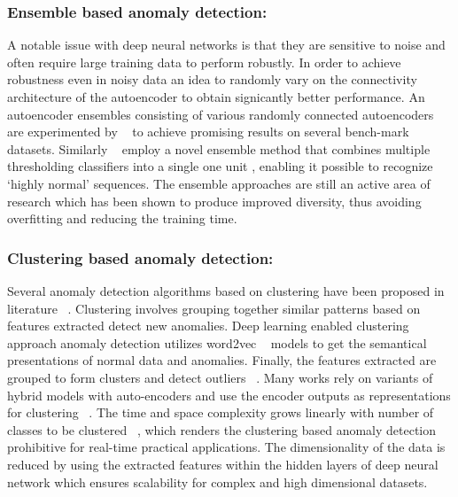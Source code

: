 \subsubsection{\textbf{Ensemble based anomaly detection:}}
 A notable issue with deep neural networks is that they are sensitive to noise and often
require large training data to perform robustly. In order to achieve robustness even in noisy data an idea to randomly vary on the connectivity architecture of the autoencoder to obtain
signicantly better performance. An autoencoder ensembles consisting of  various randomly connected autoencoders are experimented by  ~\cite{chen2017outlier} to achieve promising results on several bench-mark datasets. Similarly ~\cite{kim2016lstm} employ a novel ensemble method that combines  multiple thresholding classifiers into a single one unit , enabling it possible to recognize ‘highly normal’ sequences. The ensemble approaches are still an active area of research which has been shown to produce improved diversity, thus avoiding overfitting and reducing the training time.

\subsubsection{\textbf{Clustering based anomaly detection:}}
Several anomaly detection  algorithms based on clustering have been proposed in literature ~\cite{ester1996density}. Clustering involves grouping together similar patterns based on features extracted  detect new anomalies.  Deep learning enabled clustering approach anomaly detection utilizes word2vec ~\cite{mikolov2013efficient}  models to get the semantical presentations of normal data and anomalies. Finally, the features extracted are grouped to form clusters and detect outliers ~\cite{yuan2017deep}. Many works rely on variants of hybrid models with auto-encoders and use the encoder outputs as representations for clustering ~\cite{aytekin2018clustering,xie2016unsupervised,guo2017improved,xie2016unsupervised,guo2017deep,wang2016learning,mani2018scalable}. The time and space complexity grows linearly with number of classes to be clustered ~\cite{sreekanth2010generalized}, which renders the clustering based anomaly detection prohibitive for real-time practical applications. The dimensionality of the data is reduced by using the extracted features within the hidden layers of deep neural network which ensures scalability for complex and high dimensional datasets.


